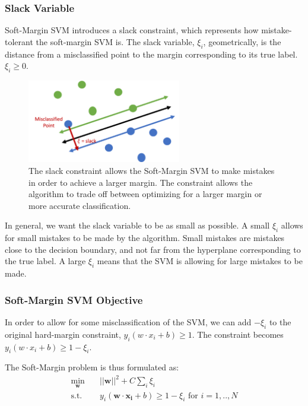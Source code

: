 \documentclass[11pt]{article}
\begin{document}
\subsubsection{Slack Variable}

Soft-Margin SVM introduces a slack constraint, which represents how mistake-tolerant the soft-margin SVM is. The slack variable, $ \xi_i$, geometrically, is the distance from a misclassified point to the margin corresponding to its true label. $\xi_i\geq 0$.

\begin{figure}[H]
    \centering
    \includegraphics[width=0.6\textwidth]{images/slack.png}
    \caption{The slack constraint allows the Soft-Margin SVM to make mistakes in order to achieve a larger margin. The constraint allows the algorithm to trade off between optimizing for a larger margin or more accurate classification.}
    \label{fig:my_label}
\end{figure}

In general, we want the slack variable to be as small as possible. A small $\xi_i$ allows for small mistakes to be made by the algorithm. Small mistakes are mistakes close to the decision boundary, and not far from the hyperplane corresponding to the true label. A large $\xi_i$ means that the SVM is allowing for large mistakes to be made.

\subsubsection{Soft-Margin SVM Objective}
In order to allow for some misclassification of the SVM, we can add $- \xi_i$ to the original hard-margin constraint, $y_i(w \cdot x_i + b) \geq 1$. The constraint becomes $y_i(w \cdot x_i + b) \geq 1 - \xi_i$. 

The Soft-Margin problem is thus formulated as:
\begin{equation}
\begin{aligned}
\min_{\mathbf{w}} \quad & ||\mathbf{w}||^2 + C\sum_i \xi_i \\
\textrm{s.t.} \quad &
 y_i(\mathbf{w} \cdot \mathbf{x_{i}} +b) \geq 1 -\xi_i \text{ for } i = 1, .., N\\
\end{aligned}
\end{equation}
\end{document}
